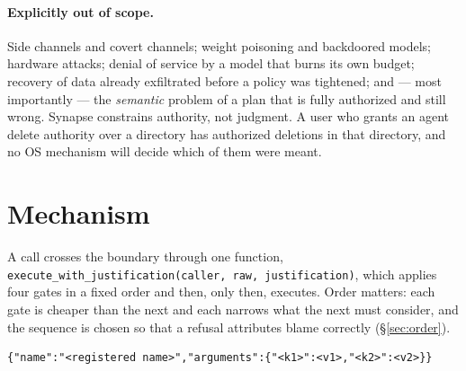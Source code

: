 \documentclass[11pt]{article}
\newcommand{\syn}{Synapse}
\newcommand{\code}[1]{\texttt{#1}}
\begin{document}
\paragraph{Explicitly out of scope.} Side channels and covert channels;
weight poisoning and backdoored models; hardware attacks; denial of service by
a model that burns its own budget; recovery of data already exfiltrated before
a policy was tightened; and --- most importantly --- the \emph{semantic}
problem of a plan that is fully authorized and still wrong. \syn{} constrains
authority, not judgment. A user who grants an agent delete authority over a
directory has authorized deletions in that directory, and no OS mechanism
will decide which of them were meant.

\section{Mechanism}
\label{sec:mech}

A call crosses the boundary through one function,
\code{execute\_with\_justification(caller, raw, justification)}, which applies
four gates in a fixed order and then, only then, executes. Order matters: each
gate is cheaper than the next
and each narrows what the next must consider, and the sequence is chosen so
that a refusal attributes blame correctly (\S\ref{sec:order}).

\begin{lstlisting}[caption={The wire shape a plan must take. Canonical
MCP-flavoured JSON with no insignificant whitespace; arguments appear in the
registry's declared order.},label={lst:wire}]
{"name":"<registered name>","arguments":{"<k1>":<v1>,"<k2>":<v2>}}
\end{lstlisting}
\end{document}
